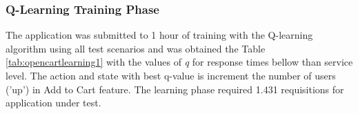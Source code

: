 \documentclass[espaco=umemeio,chapter=TITLE,twoside,openright]{abnt}
\begin{document}
\subsubsection{Q-Learning Training Phase}

The application was submitted to 1 hour of training with the  Q-learning algorithm using all test scenarios  and was obtained the Table \ref{tab:opencartlearning1} with the values of \textit{q}  for response times bellow than service level. The action and state with best q-value is increment the number of users ('up') in Add to Cart feature. The learning phase required 1.431 requisitions for application under test. 


\end{document}
